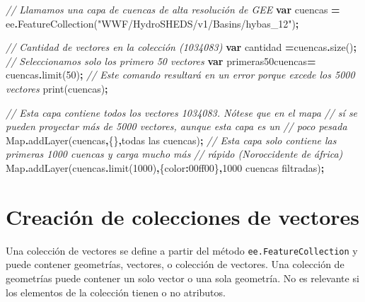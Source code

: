 \documentclass[
  12pt,
  letterpaper,
  twoside]{book}
\newenvironment{Shaded}{\begin{snugshade}}{\end{snugshade}}
\newcommand{\BuiltInTok}[1]{#1}
\newcommand{\CommentTok}[1]{\textcolor[rgb]{0.56,0.35,0.01}{\textit{#1}}}
\newcommand{\DataTypeTok}[1]{\textcolor[rgb]{0.13,0.29,0.53}{#1}}
\newcommand{\DecValTok}[1]{\textcolor[rgb]{0.00,0.00,0.81}{#1}}
\newcommand{\FunctionTok}[1]{\textcolor[rgb]{0.00,0.00,0.00}{#1}}
\newcommand{\KeywordTok}[1]{\textcolor[rgb]{0.13,0.29,0.53}{\textbf{#1}}}
\newcommand{\NormalTok}[1]{#1}
\newcommand{\OperatorTok}[1]{\textcolor[rgb]{0.81,0.36,0.00}{\textbf{#1}}}
\newcommand{\StringTok}[1]{\textcolor[rgb]{0.31,0.60,0.02}{#1}}
\begin{document}
\begin{Shaded}
\begin{Highlighting}[]
\CommentTok{// Llamamos una capa de cuencas de alta resolución de GEE}
\KeywordTok{var}\NormalTok{ cuencas }\OperatorTok{=}\NormalTok{ ee}\OperatorTok{.}\FunctionTok{FeatureCollection}\NormalTok{(}\StringTok{"WWF/HydroSHEDS/v1/Basins/hybas\_12"}\NormalTok{)}\OperatorTok{;}

\CommentTok{// Cantidad de vectores en la colección (1034083)}
\KeywordTok{var}\NormalTok{ cantidad }\OperatorTok{=}\NormalTok{cuencas}\OperatorTok{.}\FunctionTok{size}\NormalTok{()}\OperatorTok{;} 
\CommentTok{// Seleccionamos solo los primero 50 vectores}
\KeywordTok{var}\NormalTok{ primeras50cuencas}\OperatorTok{=}\NormalTok{ cuencas}\OperatorTok{.}\FunctionTok{limit}\NormalTok{(}\DecValTok{50}\NormalTok{)}\OperatorTok{;} 
\CommentTok{// Este comando resultará en un error porque excede los 5000 vectores}
\FunctionTok{print}\NormalTok{(cuencas)}\OperatorTok{;} 

\CommentTok{// Esta capa contiene todos los vectores 1034083. Nótese que en el mapa }
\CommentTok{// sí se pueden proyectar más de 5000 vectores, aunque esta capa es un }
\CommentTok{// poco pesada }
\BuiltInTok{Map}\OperatorTok{.}\FunctionTok{addLayer}\NormalTok{(cuencas}\OperatorTok{,}\NormalTok{\{\}}\OperatorTok{,}\StringTok{\textquotesingle{}todas las cuencas\textquotesingle{}}\NormalTok{)}\OperatorTok{;}
\CommentTok{// Esta capa solo contiene las primeras 1000 cuencas y carga mucho más }
\CommentTok{// rápido (Noroccidente de áfrica)}
\BuiltInTok{Map}\OperatorTok{.}\FunctionTok{addLayer}\NormalTok{(cuencas}\OperatorTok{.}\FunctionTok{limit}\NormalTok{(}\DecValTok{1000}\NormalTok{)}\OperatorTok{,}\NormalTok{\{}\DataTypeTok{color}\OperatorTok{:}\StringTok{\textquotesingle{}00ff00\textquotesingle{}}\NormalTok{\}}\OperatorTok{,}\StringTok{\textquotesingle{}1000 cuencas filtradas\textquotesingle{}}\NormalTok{)}\OperatorTok{;}
\end{Highlighting}
\end{Shaded}

\hypertarget{creaciuxf3n-de-colecciones-de-vectores}{%
\section{Creación de colecciones de vectores}\label{creaciuxf3n-de-colecciones-de-vectores}}

Una colección de vectores se define a partir del método \texttt{ee.FeatureCollection} y puede contener geometrías, vectores, o colección de vectores. Una colección de geometrías puede contener un solo vector o una sola geometría. No es relevante si los elementos de la colección tienen o no atributos.
\end{document}
